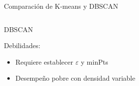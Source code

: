 \documentclass[aspectratio=169,12pt]{beamer}
\begin{document}
\begin{frame}{Comparación de K-means y DBSCAN}
\begin{columns}[t]
\begin{block}{DBSCAN}
{                Debilidades:
                    \begin{itemize}[noitemsep,nolistsep]
                        \item Requiere establecer $\varepsilon$ y minPts
                        \item Desempeño pobre con densidad variable
                    \end{itemize}
}
        \end{block}
    \end{columns}
\end{frame}
\end{document}
